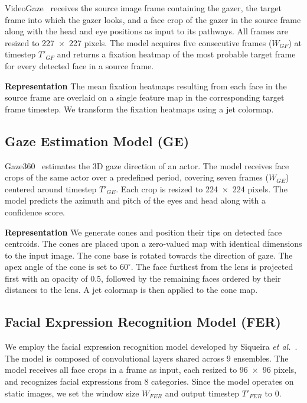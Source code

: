 \documentclass{article}
\begin{document}
VideoGaze~\cite{recasens2017following} receives the source image frame containing the gazer, the target frame into which the gazer looks, and a face crop of the gazer in the source frame along with the head and eye positions as input to its pathways. 
All frames are resized to 227~$\times$~227 pixels. 
The model acquires five consecutive frames ($W_{GF}$) at timestep $T'_{GF}$ and returns a fixation heatmap of the most probable target frame for every detected face in a source frame. 

\textbf{Representation} The mean fixation heatmaps resulting from each face in the source frame are overlaid on a single feature map in the corresponding target frame timestep. We transform the fixation heatmaps using a jet colormap.

\subsection{Gaze Estimation Model (GE)}

Gaze360~\cite{kellnhofer2019gaze360} estimates the 3D gaze direction of an actor. The model receives face crops of the same actor over a predefined period, covering seven frames ($W_{GE}$) centered around timestep $T'_{GE}$. Each crop is resized to 224~$\times$~224 pixels. The model predicts the azimuth and pitch of the eyes and head along with a confidence score.

\textbf{Representation} 
We generate cones and position their tips on detected face centroids.
The cones are placed upon a zero-valued map with identical dimensions to the input image. The cone base is rotated towards the direction of gaze. 
The apex angle of the cone is set to $60^{\circ}$. The face furthest 
from the lens is projected first with an opacity of 0.5, followed by the remaining faces ordered by their distances to the lens. A jet colormap is then applied to the cone map.

\subsection{Facial Expression Recognition Model (FER)}

We employ the facial expression recognition model developed by Siqueira \textit{et al.}~. The model is composed of convolutional layers shared across $9$ ensembles.
The model receives all face crops in a frame as input, each resized to 96~$\times$~96 pixels, and recognizes facial expressions from 8 categories. Since the model operates on static images, we set the window size $W_{FER}$ and output timestep $T'_{FER}$ to 0.
\end{document}
